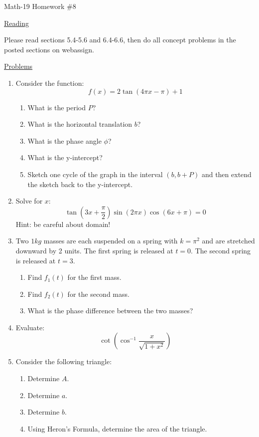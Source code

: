 \documentclass[letterpaper,12pt,fleqn]{article}
\begin{document}
\begin{center}
\Large Math-19 Homework \#8
\end{center}

\vspace{0.5in}

\underline{Reading}

Please read sections 5.4-5.6 and 6.4-6.6, then do all concept problems in the
posted sections on web\-assign.

\underline{Problems}

\begin{enumerate}
\item Consider the function:
\[f(x)=2\tan(4\pi x-\pi)+1\]
\begin{enumerate}
\item What is the period $P$?
\item What is the horizontal translation $b$?
\item What is the phase angle $\phi$?
\item What is the y-intercept?
\item Sketch one cycle of the graph in the interval $(b,b+P)$ and then extend
the sketch back to the y-intercept.
\end{enumerate}

\item Solve for $x$:
\[\tan\left(3x+\frac{\pi}{2}\right)\sin(2\pi x)\cos(6x+\pi)=0\]
Hint: be careful about domain!

\item Two $1kg$ masses are each suspended on a spring with $k=\pi^2$ and are
stretched downward by 2 units. The first spring is released at $t=0$. The
second spring is released at $t=3$.
\begin{enumerate}
\item Find $f_1(t)$ for the first mass.
\item Find $f_2(t)$ for the second mass.
\item What is the phase difference between the two masses?
\end{enumerate}

\item Evaluate:
\[\cot\left(\cos^{-1}\frac{x}{\sqrt{1+x^2}}\right)\]
\newpage
\item Consider the following triangle:

\bigskip

\begin{figure}[h]
\setlength{\leftskip}{0.5in}
\end{figure}

\begin{enumerate}
\item Determine $A$.
\item Determine $a$.
\item Determine $b$.
\item Using Heron's Formula, determine the area of the triangle.
\end{enumerate}
\end{enumerate}
\end{document}
